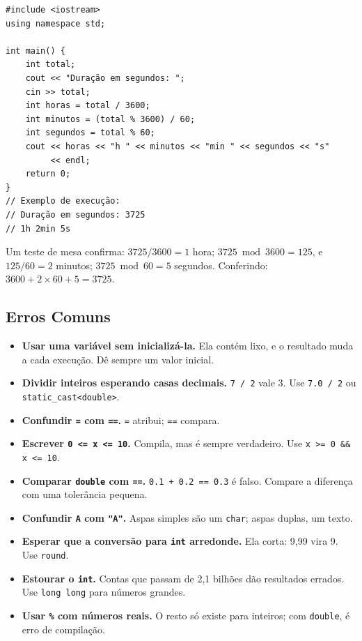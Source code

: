 \begin{codigo}
\begin{Verbatim}[breaklines=true, breaksymbolleft={}, fontsize=\footnotesize]
#include <iostream>
using namespace std;

int main() {
    int total;
    cout << "Duração em segundos: ";
    cin >> total;
    int horas = total / 3600;
    int minutos = (total % 3600) / 60;
    int segundos = total % 60;
    cout << horas << "h " << minutos << "min " << segundos << "s"
         << endl;
    return 0;
}
// Exemplo de execução:
// Duração em segundos: 3725
// 1h 2min 5s
\end{Verbatim}
\end{codigo}

Um teste de mesa confirma: $3725 / 3600 = 1$ hora; $3725 \bmod 3600 = 125$, e $125 / 60 = 2$ minutos; $3725 \bmod 60 = 5$ segundos. Conferindo: $3600 + 2 \times 60 + 5 = 3725$.

\subsection{Erros Comuns}

\begin{itemize}
  \item \textbf{Usar uma variável sem inicializá-la.} Ela contém lixo, e o resultado muda a cada execução. Dê sempre um valor inicial.
  \item \textbf{Dividir inteiros esperando casas decimais.} \texttt{7 / 2} vale 3. Use \texttt{7.0 / 2} ou \texttt{static\_cast<double>}.
  \item \textbf{Confundir \texttt{=} com \texttt{==}.} \texttt{=} atribui; \texttt{==} compara.
  \item \textbf{Escrever \texttt{0 <= x <= 10}.} Compila, mas é sempre verdadeiro. Use \texttt{x >= 0 \&\& x <= 10}.
  \item \textbf{Comparar \texttt{double} com \texttt{==}.} \texttt{0.1 + 0.2 == 0.3} é falso. Compare a diferença com uma tolerância pequena.
  \item \textbf{Confundir \texttt{\textquotesingle{}A\textquotesingle{}} com \texttt{"A"}.} Aspas simples são um \texttt{char}; aspas duplas, um texto.
  \item \textbf{Esperar que a conversão para \texttt{int} arredonde.} Ela corta: 9,99 vira 9. Use \texttt{round}.
  \item \textbf{Estourar o \texttt{int}.} Contas que passam de 2,1 bilhões dão resultados errados. Use \texttt{long long} para números grandes.
  \item \textbf{Usar \texttt{\%} com números reais.} O resto só existe para inteiros; com \texttt{double}, é erro de compilação.
\end{itemize}
